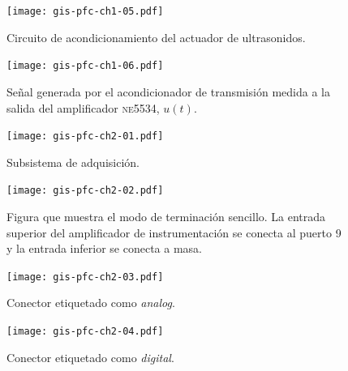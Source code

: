 \documentclass[a4paper,12pt]				{article}
\begin{document}
\begin{figure}
	\begin{center}
		\texttt{[image: gis-pfc-ch1-05.pdf]}
	\end{center}
	\caption[Circuito de acondicionamiento del actuador
	piezoeléctrico]{Circuito de acondicionamiento del actuador de
	ultrasonidos.}
	\label{fig:newtxconditioner}
\end{figure}

\begin{figure}
	\begin{center}
		\texttt{[image: gis-pfc-ch1-06.pdf]}
	\end{center}
	\caption[Señal a la salida del amplificador \textsc{ne5534},
	$u(t)$]{Señal generada por el acondicionador de transmisión medida
	a la salida del amplificador \textsc{ne5534}, $u(t)$.}
	\label{fig:txacvo}
\end{figure}

\begin{figure}
	\begin{center}
		\texttt{[image: gis-pfc-ch2-01.pdf]}
	\end{center}
	\caption[Subsistema de adquisición]{Subsistema de adquisición.}
	\label{fig:subacqui}
\end{figure}

\clearpage

\begin{figure}
	\begin{center}
		\texttt{[image: gis-pfc-ch2-02.pdf]}
	\end{center}
	\caption[Ejemplo de configuración de terminación]{Figura que
	muestra el modo de terminación sencillo. La entrada superior del
	amplificador de instrumentación se conecta al puerto 9 y la entrada
	inferior se conecta a masa.}
	\label{fig:termmodes}
\end{figure}

\begin{figure}
	\begin{center}
		\texttt{[image: gis-pfc-ch2-03.pdf]}
	\end{center}
	\caption[Conector etiquetado como \emph{analog}]{Conector
	etiquetado como \emph{analog}.}
	\label{fig:analog}
\end{figure}

\begin{figure}
	\begin{center}
		\texttt{[image: gis-pfc-ch2-04.pdf]}
	\end{center}
	\caption[Conector etiquetado como \emph{digital}]{Conector
	etiquetado como \emph{digital}.}
	\label{fig:digital}
\end{figure}
\end{document}
